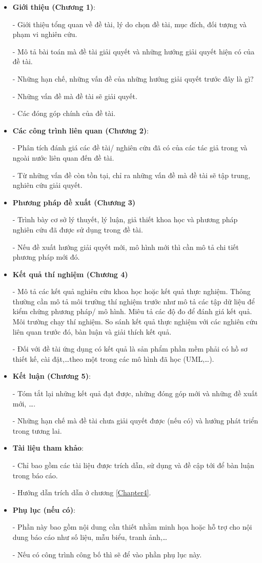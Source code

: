 \begin{itemize}
\item \textbf{Giới thiệu (Chương 1)}: 

- Giới thiệu tổng quan về đề tài, lý do chọn đề tài, mục đích, đối tượng và phạm vi nghiên cứu.

- Mô tả bài toán mà đề tài giải quyết và những hướng giải quyết hiện có của đề tài.

- Những hạn chế, những vấn đề của những hướng giải quyết trước đây là gì?

- Những vấn đề mà đề tài sẽ giải quyết.

- Các đóng góp chính của đề tài.

\item \textbf{Các công trình liên quan (Chương 2)}: 

- Phân tích đánh giá các đề tài/ nghiên cứu đã có của các tác giả trong và ngoài nước liên quan đến đề tài.

- Từ những vấn đề còn tồn tại, chỉ ra những vấn đề mà đề tài sẽ tập trung, nghiên cứu giải quyết.

\item \textbf{Phương pháp đề xuất (Chương 3)}

- Trình bày cơ sở lý thuyết, lý luận, giả thiết khoa học và phương pháp nghiên cứu đã được sử dụng trong đề tài.

- Nếu đề xuất hướng giải quyết mới, mô hình mới thì cần mô tả chi tiết phương pháp mới đó.

\item \textbf{Kết quả thí nghiệm (Chương 4)}

- Mô tả các kết quả nghiên cứu khoa học hoặc kết quả thực nghiệm. Thông thường cần mô tả môi trường thí nghiệm trước như mô tả các tập dữ liệu để kiểm chứng phương pháp/ mô hình. Miêu tả các độ đo để đánh giá kết quả. Môi trường chạy thí nghiệm. So sánh kết quả thực nghiệm với các nghiên cứu liên quan trước đó, bàn luận và giải thích kết quả.

- Đối với đề tài ứng dụng có kết quả là sản phẩm phần mềm phải có hồ sơ thiết kế, cài đặt,\ldots theo một trong các mô hình đã học (UML,\ldots).

\item \textbf{Kết luận (Chương 5)}:

 - Tóm tắt lại những kết quả đạt được, những đóng góp mới và những đề xuất mới, \ldots.
 
 - Những hạn chế mà đề tài chưa giải quyết được (nếu có) và hướng phát triển trong tương lai.

\item \textbf{Tài liệu tham khảo}: 

- Chỉ bao gồm các tài liệu được trích dẫn, sử dụng và đề cập tới để bàn luận trong báo cáo.

- Hướng dẫn trích dẫn ở chương \ref{Chapter4}.

\item \textbf{Phụ lục (nếu có)}:

- Phần này bao gồm nội dung cần thiết nhằm minh họa hoặc hỗ trợ cho nội dung báo cáo như số liệu, mẫu biểu, tranh ảnh,\ldots 

- Nếu có công trình công bố thì sẽ để vào phần phụ lục này.
\end{itemize}

